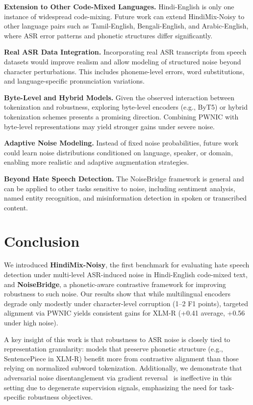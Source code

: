 \documentclass[conference]{IEEEtran}
\begin{document}
\textbf{Extension to Other Code-Mixed Languages.}
Hindi-English is only one instance of widespread code-mixing. Future work can extend HindiMix-Noisy to other language pairs such as Tamil-English, Bengali-English, and Arabic-English, where ASR error patterns and phonetic structures differ significantly.

\textbf{Real ASR Data Integration.}
Incorporating real ASR transcripts from speech datasets would improve realism and allow modeling of structured noise beyond character perturbations. This includes phoneme-level errors, word substitutions, and language-specific pronunciation variations.

\textbf{Byte-Level and Hybrid Models.}
Given the observed interaction between tokenization and robustness, exploring byte-level encoders (e.g., ByT5) or hybrid tokenization schemes presents a promising direction. Combining PWNIC with byte-level representations may yield stronger gains under severe noise.

\textbf{Adaptive Noise Modeling.}
Instead of fixed noise probabilities, future work could learn noise distributions conditioned on language, speaker, or domain, enabling more realistic and adaptive augmentation strategies.

\textbf{Beyond Hate Speech Detection.}
The NoiseBridge framework is general and can be applied to other tasks sensitive to noise, including sentiment analysis, named entity recognition, and misinformation detection in spoken or transcribed content.


\section{Conclusion}

We introduced \textbf{HindiMix-Noisy}, the first benchmark for evaluating hate speech detection under multi-level ASR-induced noise in Hindi-English code-mixed text, and \textbf{NoiseBridge}, a phonetic-aware contrastive framework for improving robustness to such noise. Our results show that while multilingual encoders degrade only modestly under character-level corruption (1--2 F1 points), targeted alignment via PWNIC yields consistent gains for XLM-R (+0.41 average, +0.56 under high noise).

A key insight of this work is that robustness to ASR noise is closely tied to representation granularity: models that preserve phonetic structure (e.g., SentencePiece in XLM-R) benefit more from contrastive alignment than those relying on normalized subword tokenization. Additionally, we demonstrate that adversarial noise disentanglement via gradient reversal~\cite{ganin2016domain} is ineffective in this setting due to degenerate supervision signals, emphasizing the need for task-specific robustness objectives.
\end{document}
